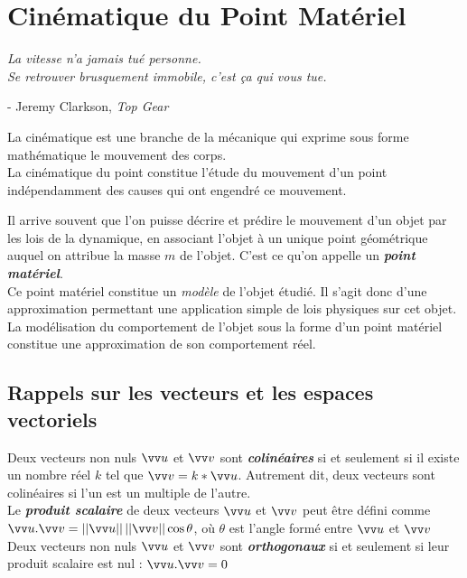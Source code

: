 \documentclass[10.5pt,a4paper]{book}
\begin{document}
\setlength\intextsep{0pt}
\chapter{Cinématique du Point Matériel}

\vspace{-3ex}

\begin{flushright}

\textit{\og La vitesse n'a jamais tué personne.\\ 
 Se retrouver brusquement immobile, c'est ça qui vous tue.\fg}

- Jeremy Clarkson, \textit{Top Gear}
\end{flushright}

\vspace{2ex}

La cinématique est une branche de la mécanique qui exprime sous forme mathématique le mouvement des corps.\\
La cinématique du point constitue l’étude du mouvement d’un point indépendamment des causes qui ont engendré ce mouvement.

\begin{boite}
Il arrive souvent que l'on puisse décrire et prédire le mouvement d'un objet par les lois de la dynamique, en associant l'objet à un unique point géométrique auquel on attribue la masse $m$ de l'objet. C'est ce qu'on appelle un \emph{\textbf{point matériel}}.\\
Ce point matériel constitue un \emph{modèle} de l'objet étudié. Il s'agit donc d'une approximation permettant une application simple de lois physiques sur cet objet. La modélisation du comportement de l'objet sous la forme d'un point matériel constitue une approximation de son comportement réel.
\end{boite}

\section{Rappels sur les vecteurs et les espaces vectoriels}

\begin{boite}
Deux vecteurs non nuls $\vv u$ et $\vv v$ sont \emph{\textbf{colinéaires}} si et seulement si il existe un nombre réel $k$ tel que $\vv v = k*\vv u$.
Autrement dit, deux vecteurs sont colinéaires si l’un est un multiple de l’autre. \\

Le \emph{\textbf{produit scalaire}} de deux vecteurs $\vv u$ et $\vv v$ peut être défini comme $\vv u .\vv v = \left|\left|\vv u\right|\right| \left|\left|\vv v\right|\right| \cos{\theta}$, où $\theta$ est l’angle formé entre $\vv u$ et $\vv v$\\

Deux vecteurs non nuls $\vv u$ et $\vv v$ sont \emph{\textbf{orthogonaux}} si et seulement si leur produit scalaire est nul : $\vv u .\vv v = 0$
\end{boite}
\end{document}
